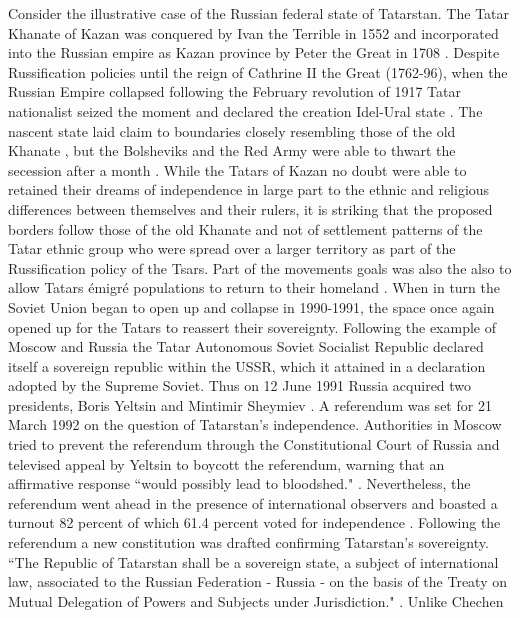 \documentclass[12pt]{article}
\begin{document}
Consider the illustrative case of the Russian federal state of Tatarstan. The
Tatar Khanate of Kazan was conquered by Ivan the Terrible in 1552 and
incorporated into the Russian empire as Kazan province by Peter the Great in
1708 \citep{Sharifzhanov_2007}. Despite Russification policies until the reign
of Cathrine II the Great (1762-96), when the Russian Empire collapsed following
the February revolution of 1917 Tatar nationalist seized the moment and declared
the creation Idel-Ural state \citep{Devlet_1993}. The nascent state laid claim
to boundaries closely resembling those of the old Khanate \citep{Hartley2020},
but the Bolsheviks and the Red Army were able to thwart the secession after a
month \citep{Hartley2020}. While the Tatars of Kazan no doubt were able to
retained their dreams of independence in large part to the ethnic and religious
differences between themselves and their rulers, it is striking that the
proposed borders follow those of the old Khanate and not of settlement patterns
of the Tatar ethnic group who were spread over a larger territory as part of the
Russification policy of the Tsars. Part of the movements goals was also the also
to allow Tatars émigré populations to return to their homeland
\citep{Devlet_1993}. When in turn the Soviet Union began to open up and collapse
in 1990-1991, the space once again opened up for the Tatars to reassert their
sovereignty. Following the example of Moscow and Russia the Tatar Autonomous
Soviet Socialist Republic declared itself a sovereign republic within the USSR,
which it attained in a declaration adopted by the Supreme Soviet. Thus on 12
June 1991 Russia acquired two presidents, Boris Yeltsin and Mintimir Sheymiev
\citep{Sharifzhanov_2007}. A referendum was set for 21 March 1992 on the
question of Tatarstan's independence. Authorities in Moscow tried to prevent
the referendum through the Constitutional Court of Russia and televised appeal
by Yeltsin to boycott the referendum, warning that an affirmative response
``would possibly lead to bloodshed." \citep{Sharifzhanov_2007}.  Nevertheless,
the referendum went ahead in the presence of international observers and boasted
a turnout 82 percent of which 61.4 percent voted for independence
\citep{Devlet_1993}. Following the referendum a new constitution was drafted
confirming Tatarstan's sovereignty. ``The Republic of Tatarstan shall be a
sovereign state, a subject of international law, associated to the Russian
Federation - Russia - on the basis of the Treaty on Mutual Delegation of Powers
and Subjects under Jurisdiction." \citet{Sharifzhanov_2007}. Unlike Chechen
\end{document}
